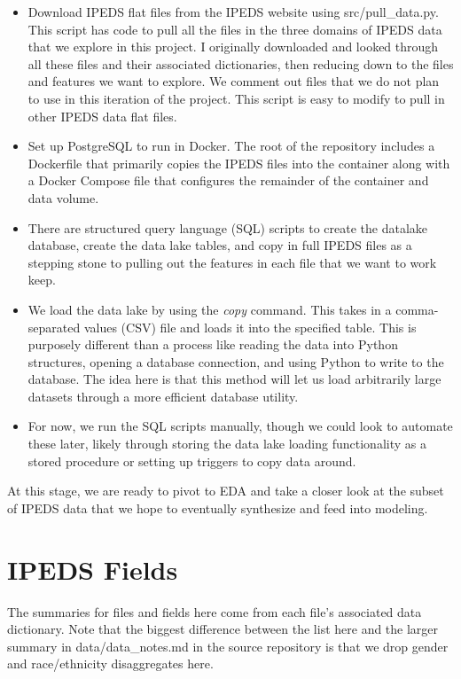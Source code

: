 \documentclass[sigconf, authorversion, nonacm]{acmart}
\begin{document}
    \begin{itemize}
        \item Download IPEDS flat files from the IPEDS website using src/pull_data.py. This script has code to pull all the files in the three domains of IPEDS data that we explore in this project. I originally downloaded and looked through all these files and their associated dictionaries, then reducing down to the files and features we want to explore. We comment out files that we do not plan to use in this iteration of the project. This script is easy to modify to pull in other IPEDS data flat files.
        \item Set up PostgreSQL to run in Docker. The root of the repository includes a Dockerfile that primarily copies the IPEDS files into the container along with a Docker Compose file that configures the remainder of the container and data volume.
        \item There are structured query language (SQL) scripts to create the datalake database, create the data lake tables, and copy in full IPEDS files as a stepping stone to pulling out the features in each file that we want to work keep.
        \item We load the data lake by using the \textit{copy} command. This takes in a comma-separated values (CSV) file and loads it into the specified table. This is purposely different than a process like reading the data into Python structures, opening a database connection, and using Python to write to the database. The idea here is that this method will let us load arbitrarily large datasets through a more efficient database utility.
        \item For now, we run the SQL scripts manually, though we could look to automate these later, likely through storing the data lake loading functionality as a stored procedure or setting up triggers to copy data around.
    \end{itemize}

    At this stage, we are ready to pivot to EDA and take a closer look at the subset of IPEDS data that we hope to eventually synthesize and feed into modeling.

\section{IPEDS Fields}
    The summaries for files and fields here come from each file's associated data dictionary. Note that the biggest difference between the list here and the larger summary in data/data_notes.md in the source repository is that we drop gender and race/ethnicity disaggregates here.
\end{document}
